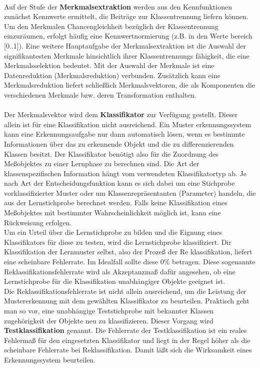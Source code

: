 \paragraph{}
Auf der Stufe der \textbf{Merkmalsextraktion} werden aus den Kennfunktionen
zun\"achst Kennwerte ermittelt, die Beitr\"age zur Klassentrennung liefern
k\"onnen. Um den Merkmalen Chancengleichheit bez\"uglich der Klassentrennung
einzur\"aumen, erfolgt h\"aufig eine Kennwertnormierung (z.B. in den Werte%
bereich [0..1]). Eine weitere Hauptaufgabe der Merkmalsextraktion ist die
Auswahl der signifikantesten Merkmale hinsichtlich ihrer Klassentrennungs%
f\"ahigkeit, die eine Merkmalsselektion bedeutet. Mit der Auswahl der Merkmale
ist eine Datenreduktion (Merkmalsreduktion) verbunden. Zus\"atzlich kann eine
Merkmalsreduktion liefert schlie\ss{}lich Merkmalsvektoren, die als Komponenten
die verschiedenen Merkmale bzw. deren Transformation enthalten.

\paragraph{}
Der Merkmalsvektor wird dem \textbf{Klassifikator} zur Verf\"ugung gestellt.
Dieser allein ist f\"ur eine Klassifikation nicht ausreichend. Ein Muster%
erkennungssystem kann eine Erkennungsaufgabe nur dann automatisch l\"osen,
wenn es bestimmte Informationen \"uber das zu erkennende Objekt und die zu
differenzierenden Klassen besitzt. Der Klassifikator ben\"otigt also f\"ur die
Zuordnung des Me\ss{}objektes zu einer Lernphase zu berechnen sind. Die Art der
klassenspezifischen Information h\"angt vom verwendeten Klassifikatortyp ab. Je
nach Art der Entscheidungsfunktion kann es sich dabei um eine Stichprobe
vorklassifizierter Muster oder um Klassenrepr\"asentanten (Parameter) handeln,
die aus der Lernstichprobe berechnet werden. Falls keine Klassifikation eines
Me\ss{}objektes mit bestimmter Wahrscheinlichkeit m\"oglich ist, kann eine
R\"uckweisung erfolgen.\\
Um ein Urteil \"uber die Lernstichprobe zu bilden und die Eignung eines
Klassifikators f\"ur diese zu testen, wird die Lernstichprobe klassifiziert.
Dir Klassifikation der Lernmuster selbst, also der Proze\ss{} der Re%
klassifikation, liefert eine scheinbare Fehlerrate. Im Idealfall sollte
diese 0\% betragen. Diese sogenannte Reklassifikationsfehlerrate wird als
Akzeptanzma\ss{} daf\"ur angesehen, ob eine Lernstichprobe f\"ur die
Klassifikation unabh\"angiger Objekte geeignet ist.\\
Die Reklassifikationsfehlerrate ist nicht allein ausreichend, um die Leistung
der Mustererkennung mit dem gew\"ahlten Klassifikator zu beurteilen. Praktisch
geht man so vor, eine unabh\"angige Teststichprobe mit bekannter Klassen%
zugeh\"origkeit der Objekte neu zu klassifizieren. Dieser Vorgang wird \textbf{%
Testklassifikation} genannt. Die Fehlerrate der Testklassifikation ist ein
reales Fehlerma\ss{} f\"ur den eingesetzten Klassifikator und liegt in der Regel
h\"oher als die scheinbare Fehlerrate bei Reklassifikation. Damit l\"a\ss{}t
sich die Wirksamkeit eines Erkennungssystem beurteilen.

